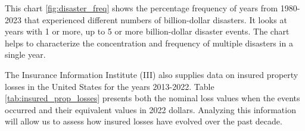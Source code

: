 \documentclass[12pt]{article}
\begin{document}
This chart \ref{fig:disaster_freq} shows the percentage frequency of years from 1980-2023 that experienced different numbers of billion-dollar disasters. It 
looks at years with 1 or more, up to 5 or more billion-dollar disaster events. The chart helps to characterize the concentration and 
frequency of multiple disasters in a single year.



\begin{table}[h]
    \caption{Natural Catastrophe Losses in the United States by Peril, 2022 (in \$ millions)}
    \label{tab:natural_cat_losses}
    \centering
    \cite{iii}
\end{table}

The Insurance Information Institute (III) \cite{iii} also supplies data on insured property losses in the United States for the years 
2013-2022. Table \ref{tab:insured_prop_losses} presents both the nominal loss values when the events occurred and their equivalent 
values in 2022 dollars. Analyzing this information will allow us to assess how insured losses have evolved over the past decade.
\end{document}
